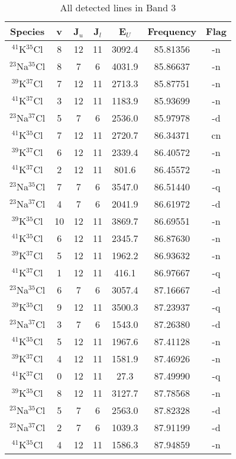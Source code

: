 \begin{table*}[htp]
\centering
\caption{All detected lines in Band 3}
\begin{tabular}{ccccccc}
\label{tab:all_detections_B3}
Species & v & J$_u$ & J$_l$ & E$_U$ & Frequency & Flag \\
\hline
$^{41}$K$^{35}$Cl & 8 & 12 & 11 & 3092.4 & 85.81356 & -n \\
$^{23}$Na$^{35}$Cl & 8 & 7 & 6 & 4031.9 & 85.86637 & -n \\
$^{39}$K$^{37}$Cl & 7 & 12 & 11 & 2713.3 & 85.87751 & -n \\
$^{41}$K$^{37}$Cl & 3 & 12 & 11 & 1183.9 & 85.93699 & -n \\
$^{23}$Na$^{37}$Cl & 5 & 7 & 6 & 2536.0 & 85.97978 & -d \\
$^{41}$K$^{35}$Cl & 7 & 12 & 11 & 2720.7 & 86.34371 & cn \\
$^{39}$K$^{37}$Cl & 6 & 12 & 11 & 2339.4 & 86.40572 & -n \\
$^{41}$K$^{37}$Cl & 2 & 12 & 11 & 801.6 & 86.45572 & -n \\
$^{23}$Na$^{35}$Cl & 7 & 7 & 6 & 3547.0 & 86.51440 & -q \\
$^{23}$Na$^{37}$Cl & 4 & 7 & 6 & 2041.9 & 86.61972 & -d \\
$^{39}$K$^{35}$Cl & 10 & 12 & 11 & 3869.7 & 86.69551 & -n \\
$^{41}$K$^{35}$Cl & 6 & 12 & 11 & 2345.7 & 86.87630 & -n \\
$^{39}$K$^{37}$Cl & 5 & 12 & 11 & 1962.2 & 86.93632 & -n \\
$^{41}$K$^{37}$Cl & 1 & 12 & 11 & 416.1 & 86.97667 & -q \\
$^{23}$Na$^{35}$Cl & 6 & 7 & 6 & 3057.4 & 87.16667 & -d \\
$^{39}$K$^{35}$Cl & 9 & 12 & 11 & 3500.3 & 87.23937 & -q \\
$^{23}$Na$^{37}$Cl & 3 & 7 & 6 & 1543.0 & 87.26380 & -d \\
$^{41}$K$^{35}$Cl & 5 & 12 & 11 & 1967.6 & 87.41128 & -n \\
$^{39}$K$^{37}$Cl & 4 & 12 & 11 & 1581.9 & 87.46926 & -n \\
$^{41}$K$^{37}$Cl & 0 & 12 & 11 & 27.3 & 87.49990 & -q \\
$^{39}$K$^{35}$Cl & 8 & 12 & 11 & 3127.7 & 87.78568 & -n \\
$^{23}$Na$^{35}$Cl & 5 & 7 & 6 & 2563.0 & 87.82328 & -d \\
$^{23}$Na$^{37}$Cl & 2 & 7 & 6 & 1039.3 & 87.91199 & -d \\
$^{41}$K$^{35}$Cl & 4 & 12 & 11 & 1586.3 & 87.94859 & -n \\

\end{tabular}
\end{table*}
